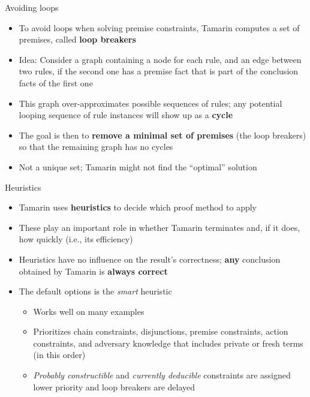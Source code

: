 \documentclass[11pt,aspectratio=169]{beamer}
\begin{document}
\begin{frame}[fragile]{Avoiding loops}
    \begin{itemize}
        \item To avoid loops when solving premise constraints, Tamarin computes 
              a set of premises, called \textbf{loop breakers}
        \item Idea: Consider a graph containing a node for each rule, and an 
              edge between two rules, if the second one has a premise fact that 
              is part of the conclusion facts of the first one
        \item This graph over-approximates possible sequences of rules; any 
              potential looping sequence of rule instances will show up as a 
              \textbf{cycle}
        \item The goal is then to \textbf{remove a minimal set of premises} 
              (the loop breakers) so that the remaining graph has no cycles
        \item Not a unique set; Tamarin might not find the ``optimal'' solution
    \end{itemize}
\end{frame}

\begin{frame}[fragile]{Heuristics}
    \begin{itemize}
        \item Tamarin uses \textbf{heuristics} to decide which proof method to 
              apply
        \item These play an important role in whether Tamarin terminates and, 
              if it does, how quickly (i.e., its efficiency)
        \item Heuristics have no influence on the result's correctness;
              \textbf{any} conclusion obtained by Tamarin is
              \textbf{always correct}
        \item The default options is the \textit{smart} heuristic
        \begin{itemize}
            \item Works well on many examples
            \item Prioritizes chain constraints, disjunctions, premise 
                  constraints, action constraints, and adversary knowledge that 
                  includes private or fresh terms (in this order)
            \item \textit{Probably constructible} and
                  \textit{currently deducible} constraints are assigned lower 
                  priority and loop breakers are delayed
        \end{itemize}
    \end{itemize}
\end{frame}
\end{document}
